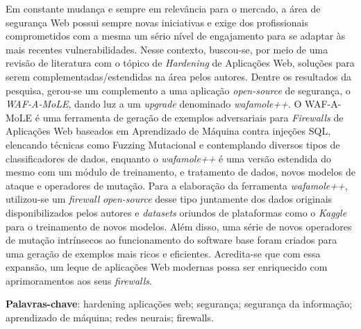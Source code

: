 \begin{resumo}
\begin{SingleSpace}
Em constante mudança e sempre em relevância para o mercado, a área de segurança Web possui sempre novas iniciativas e exige dos profissionais comprometidos com a mesma um sério nível de engajamento para se adaptar às mais recentes vulnerabilidades. Nesse contexto, buscou-se, por meio de uma revisão de literatura com o tópico de \textit{Hardening} de Aplicações Web, soluções para serem complementadas/estendidas na área pelos autores.
Dentre os resultados da pesquisa, gerou-se um complemento a uma aplicação \textit{open-source} de segurança, o \textit{WAF-A-MoLE}, dando luz a um \textit{upgrade} denominado \textit{wafamole++}. O WAF-A-MoLE é uma ferramenta de geração de exemplos adversariais para \textit{Firewalls} de Aplicações Web baseados em Aprendizado de Máquina contra injeções SQL, elencando técnicas como Fuzzing Mutacional e contemplando diversos tipos de classificadores de dados, enquanto o \textit{wafamole++} é uma versão estendida do mesmo com um módulo de treinamento, e tratamento de dados, novos modelos de ataque e operadores de mutação. Para a elaboração da ferramenta \textit{wafamole++}, utilizou-se um \textit{firewall }\textit{open-source} desse tipo juntamente dos dados originais disponibilizados pelos autores e \textit{datasets} oriundos de plataformas como o \textit{Kaggle} para o treinamento de novos modelos. Além disso, uma série de novos operadores de mutação intrínsecos ao funcionamento do software base foram criados para uma geração de exemplos mais ricos e eficientes. Acredita-se que com essa expansão, um leque de aplicações Web modernas possa ser enriquecido com aprimoramentos aos seus \textit{firewalls}.
\end{SingleSpace}
\vspace{\onelineskip}
\textbf{Palavras-chave}: hardening aplicações web; segurança; segurança da informação; aprendizado de máquina; redes neurais; firewalls.

\end{resumo}



